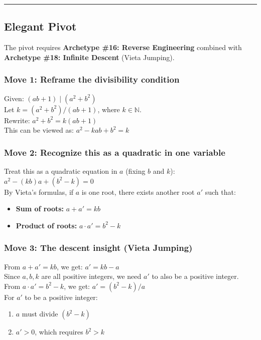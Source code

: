 \documentclass{article}
\begin{document}
\noindent \rule{\textwidth}{0.4pt}

\subsection*{Elegant Pivot}

The pivot requires \textbf{Archetype \#16: Reverse Engineering} combined with \textbf{Archetype \#18: Infinite Descent} (Vieta Jumping). \\

\subsubsection*{Move 1: Reframe the divisibility condition}
Given: $(ab + 1) \mid (a^2 + b^2)$ \\
Let $k = (a^2 + b^2)/(ab + 1)$, where $k \in \mathbb{N}$. \\
Rewrite: $a^2 + b^2 = k(ab + 1)$ \\
This can be viewed as: $a^2 - kab + b^2 = k$ \\

\subsubsection*{Move 2: Recognize this as a quadratic in one variable}
Treat this as a quadratic equation in $a$ (fixing $b$ and $k$): \\
$a^2 - (kb)a + (b^2 - k) = 0$ \\
By Vieta's formulas, if $a$ is one root, there exists another root $a'$ such that:
\begin{itemize}
    \item \textbf{Sum of roots:} $a + a' = kb$
    \item \textbf{Product of roots:} $a \cdot a' = b^2 - k$
\end{itemize}

\subsubsection*{Move 3: The descent insight (Vieta Jumping)}
From $a + a' = kb$, we get: \textbf{$a' = kb - a$} \\
Since $a, b, k$ are all positive integers, we need $a'$ to also be a positive integer. \\
From $a \cdot a' = b^2 - k$, we get: $a' = (b^2 - k)/a$ \\
For $a'$ to be a positive integer:
\begin{enumerate}
    \item $a$ must divide $(b^2 - k)$
    \item $a' > 0$, which requires $b^2 > k$
\end{enumerate}
\end{document}
